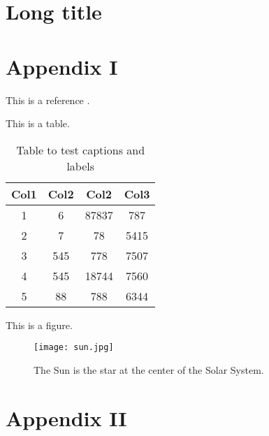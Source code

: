 \begin{refsection} %
\chapter[Short title]{Long title}


\printbibliography[heading=subbibliography, title={References}] %

\begin{appendices}
	\chapter{Appendix I}
	This is a reference \cite{Al_Amin_1996}.
	
	This is a table. 
	
	\begin{table}[h!]
		\centering
		\begin{tabular}{||c c c c||} 
			\hline
			Col1 & Col2 & Col2 & Col3 \\ [0.5ex] 
			\hline\hline
			1 & 6 & 87837 & 787 \\ 
			2 & 7 & 78 & 5415 \\
			3 & 545 & 778 & 7507 \\
			4 & 545 & 18744 & 7560 \\
			5 & 88 & 788 & 6344 \\ [1ex] 
			\hline
		\end{tabular}
		\caption{Table to test captions and labels}
		\label{table:3}
	\end{table}

	This is a figure.
	
	\begin{figure}[ht]
		\centering
		\texttt{[image: sun.jpg]}
		\caption[The sun]{The Sun is the star at the center of the Solar System.}
		\centering
		\label{fig:2}
	\end{figure}
	

	
	\chapter{Appendix II}
\end{appendices}

\end{refsection}
